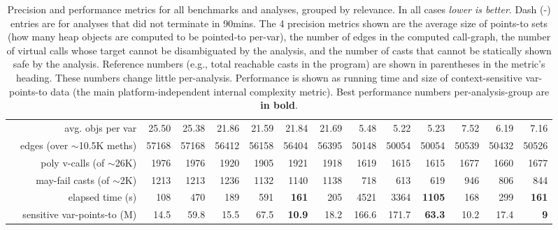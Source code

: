 \begin{table}
{\begin{tabular} {|c|r|r|r!{\vrule width 2pt}r|r|r|r!{\vrule width 2pt}r|r|r!{\vrule width 2pt}r|r|r|}
& avg. objs per var          & 25.50 & 25.38 & 21.86 & 21.59 & 21.84 & 21.69 & 5.48 & 5.22 & 5.23 & 7.52 & 6.19 & 7.16 \\
& edges (over $\sim$10.5K meths) & 57168 & 57168 & 56412 & 56158 & 56404 & 56395 & 50148 & 50054 & 50054 & 50539 & 50432 & 50526 \\
& poly v-calls (of $\sim$26K)   & 1976 & 1976 & 1920 & 1905 & 1921 & 1918 & 1619 & 1615 & 1615 & 1677 & 1660 & 1677 \\
& may-fail casts (of $\sim$2K)     & 1213 & 1213 & 1236 & 1132 & 1140 & 1138 & 718 & 613 & 619 & 946 & 806 & 844 \\
& elapsed time (s)           & 108 & 470 & 189 & 591 & {\bf 161} & 205 & 4521 & 3364 & {\bf 1105} & 168 & 299 & {\bf 161} \\
& sensitive var-points-to (M)    & 14.5 & 59.8 & 15.5 & 67.5 & {\bf 10.9} & 18.2 & 166.6 & 171.7 & {\bf 63.3} & 10.2 & 17.4 & {\bf 9} \\

\end{tabular}
}
\caption[]{Precision and performance metrics for all benchmarks and
analyses, grouped by relevance. In all cases \emph{lower is
better}. Dash (-) entries are for analyses that did not terminate in
90mins.  The 4 precision metrics shown are the average size of
points-to sets (how many heap objects are computed to be pointed-to
per-var), the number of edges in the computed call-graph, the number
of virtual calls whose target cannot be disambiguated by the analysis,
and the number of casts that cannot be statically shown safe by the
analysis. Reference numbers (e.g., total reachable casts in the
program) are shown in parentheses in the metric's heading.  These
numbers change little per-analysis. Performance is shown as running
time and size of context-sensitive var-points-to data (the main
platform-independent internal complexity metric). Best performance
numbers per-analysis-group are \textbf{in bold}.}
\label{tab:results}
\end{table}


